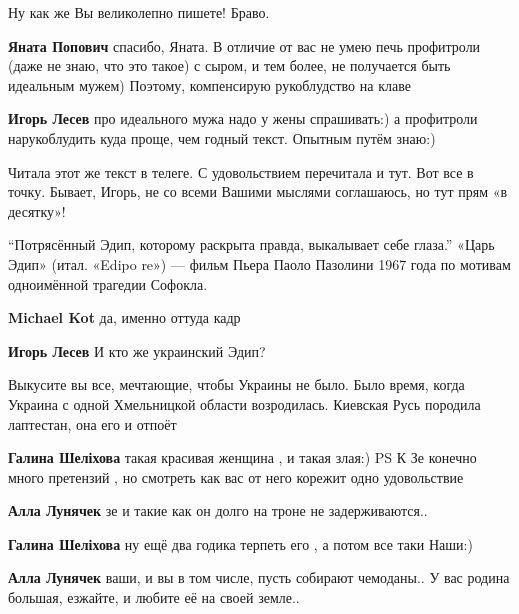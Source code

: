 \begin{itemize}
Ну как же Вы великолепно пишете! Браво.

\begin{itemize} %
\textbf{Яната Попович} спасибо, Яната. В отличие от вас не умею печь профитроли (даже не знаю, что это такое) с сыром, и тем более, не получается быть идеальным мужем) Поэтому, компенсирую рукоблудство на клаве

\textbf{Игорь Лесев} про идеального мужа надо у жены спрашивать:) а профитроли нарукоблудить куда проще, чем годный текст. Опытным путём знаю:)
\end{itemize} %


Читала этот же текст в телеге. С удовольствием перечитала и тут. Вот все в
точку. Бывает, Игорь, не со всеми Вашими мыслями соглашаюсь, но тут прям «в
десятку»!


\enquote{Потрясённый Эдип, которому раскрыта правда, выкалывает себе глаза.} «Царь
Эдип» (итал. «Edipo re») — фильм Пьера Паоло Пазолини 1967 года по мотивам
одноимённой трагедии Софокла.

\begin{itemize} %
\textbf{Michael Kot} да, именно оттуда кадр

\textbf{Игорь Лесев} И кто же украинский Эдип?
\end{itemize} %


Выкусите вы все, мечтающие, чтобы Украины не было. Было время, когда Украина с
одной Хмельницкой области возродилась. Киевская Русь породила лаптестан, она
его и отпоёт

\begin{itemize} %
\textbf{Галина Шеліхова} такая красивая женщина , и такая злая:) PS К Зе конечно много претензий , но смотреть как вас от него корежит одно удовольствие

\textbf{Алла Лунячек} зе и такие как он долго на троне не задерживаются..

\textbf{Галина Шеліхова} ну ещё два годика терпеть его , а потом все таки Наши:)

\textbf{Алла Лунячек} ваши, и вы в том числе, пусть собирают чемоданы.. У вас родина большая, езжайте, и любите её на своей земле..


\end{itemize}
\end{itemize}
